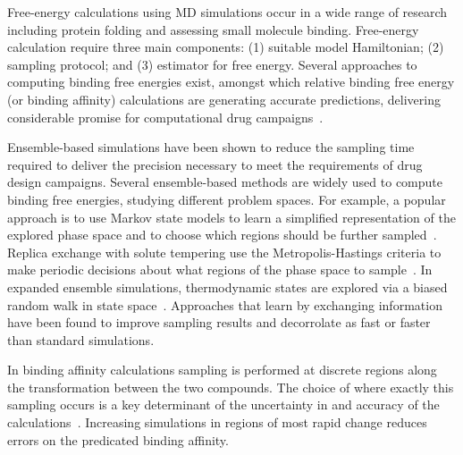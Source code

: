 Free-energy calculations using MD simulations occur in
a wide range of research including protein folding and assessing small molecule 
binding. Free-energy calculation require three main components: 
(1) suitable model Hamiltonian; (2) sampling protocol;
and (3) estimator for free energy. Several approaches to computing binding
free energies exist, amongst which relative binding free energy (or binding
affinity) calculations are generating accurate predictions, delivering
considerable promise for computational drug campaigns~\cite{Karplus2005}.

Ensemble-based simulations have been shown to reduce the sampling time
required to deliver the precision necessary to meet the requirements of drug
design campaigns. Several ensemble-based methods are widely used to compute 
binding free energies, studying different problem spaces. For example, a popular 
approach is to use Markov state models to learn a simplified representation of 
the explored phase space and to choose which regions should be further 
sampled~\cite{Bowman2010}. Replica exchange with solute tempering use the 
Metropolis-Hastings criteria to make periodic decisions about what regions of 
the phase space to sample~\cite{Earl2005,Hritz2008,Kim2012}. In
expanded ensemble simulations, thermodynamic states are explored via a biased
random walk in state space~\cite{Lyubartsev1992}. Approaches that learn by
exchanging information have been found to improve sampling results and
decorrolate as fast or faster than standard simulations.

In binding affinity calculations sampling is performed at discrete regions
along the transformation between the two compounds. The choice of where
exactly this sampling occurs is a key determinant of the uncertainty in and
accuracy of the calculations~\cite{Ruiter2013, Ruiter2016}. Increasing
simulations in regions of most rapid change reduces errors on the predicated
binding affinity.

